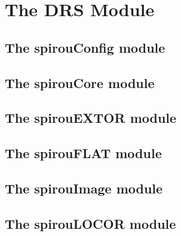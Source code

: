 \chapter{The DRS Module}
\label{ch:the_module}






\section{The spirouConfig module}
\label{ch:the_module:spirouConfig}


\section{The spirouCore module}
\label{ch:the_module:spirouCore}


\section{The spirouEXTOR module}
\label{ch:the_module:spirouEXTOR}


\section{The spirouFLAT module}
\label{ch:the_module:spirouFLAT}


\section{The spirouImage module}
\label{ch:the_module:spirouImage}


\section{The spirouLOCOR module}
\label{ch:the_module:spirouLOCOR}


